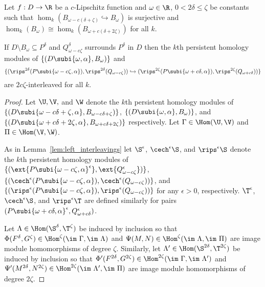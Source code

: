 \begin{theorem}
  Let $f: D\to \R$ be a $c$-Lipschitz function and $\omega\in\R$, $0 < 2\delta\leq\zeta$ be constants such that $\hom_k(B_{\omega-c(\delta+\zeta)}\hookrightarrow B_\omega)$ is surjective and $\hom_k(B_\omega)\cong \hom_k(B_{\omega+c(\delta+2\zeta)})$ for all $k$.

  If $D\setminus B_\omega\subseteq P^\delta$ and $Q_{\omega-c\zeta}^\delta$ surrounds $P^\delta$ in $D$ then the $k$th persistent homology modules of $\{(D\subi{\omega,\alpha},B_\omega)\}$ and
  \[ \{(\rips^{2\delta}(P\subi{\omega-c\zeta,\alpha}),\rips^{2\delta}(Q_{\omega-c\zeta}))\hookrightarrow (\rips^{2\zeta}(P\subi{\omega+c\delta,\alpha}),\rips^{2\zeta}(Q_{\omega+c\delta}))\}\]
  are $2c\zeta$-interleaved for all $k$.
\end{theorem}
\begin{proof}
  Let $\U,\V,$ and $\W$ denote the $k$th persistent homology modules of $\{(D\subi{\omega-c{\delta+\zeta},\alpha}, B_{\omega-c{\delta+\zeta}})\}$, $\{(D\subi{\omega,\alpha}, B_\omega)\}$, and $\{(D\subi{\omega+c{\delta+2\zeta},\alpha}, B_{\omega+c{\delta+2\zeta}})\}$ respectively.
  Let $\Gamma\in\Hom(\U,\V)$ and $\Pi\in\Hom(\V,\W)$.

  As in Lemma~\ref{lem:left_interleavings} let $\S^\epsilon$, $\cech^\epsilon\S$, and $\rips^\epsilon\S$ denote the $k$th persistent homology modules of $\{(\ext{P\subi{\omega-c\zeta, \alpha}^\epsilon}, \ext{Q^\epsilon_{\omega-c\zeta}})\}$, $\{(\cech^\epsilon(P\subi{\omega-c\zeta, \alpha}),\cech^\epsilon(Q_{\omega-c\zeta}))\}$, and $\{(\rips^\epsilon(P\subi{\omega-c\zeta, \alpha}),\rips^\epsilon(Q_{\omega-c\zeta}))\}$ for any $\epsilon > 0$, respectively.
  $\T^\epsilon$, $\cech^\epsilon\S$, and $\rips^\epsilon\T$ are defined similarly for pairs $(P\subi{\omega+c\delta, \alpha}^\epsilon, Q^\epsilon_{\omega+c\delta})$.

  Let $\Lambda\in\Hom(\S^\delta, \T^\zeta)$ be induced by inclusion so that $\Phi(F^\delta, G^\zeta)\in\Hom^{\zeta}(\im~\Gamma, \im~\Lambda)$ and $\Psi(M, N)\in\Hom^{\zeta}(\im~\Lambda, \im~\Pi)$ are image module homomorphisms of degree $\zeta$.
  Similarly, let $\Lambda'\in\Hom(\S^{2\delta}, \T^{2\zeta})$ be induced by inclusion so that $\Phi'(F^{2\delta}, G^{2\zeta})\in\Hom^{2\zeta}(\im~\Gamma, \im~\Lambda')$ and $\Psi'(M^{2\delta}, N^{2\zeta})\in\Hom^{2\zeta}(\im~\Lambda', \im~\Pi)$ are image module homomorphisms of degree $2\zeta$.


\end{proof}
